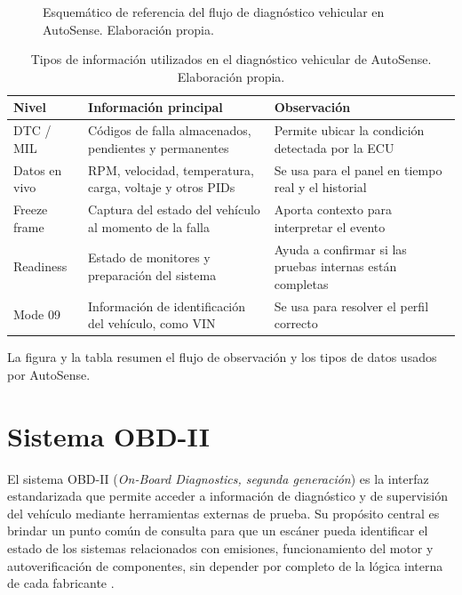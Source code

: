 \documentclass[12pt,letterpaper]{report}
\begin{document}
\begin{figure}[!htbp]
{
    }
    \caption{Esquemático de referencia del flujo de diagnóstico vehicular en AutoSense. Elaboración propia.}
    \label{fig:diagnostico-vehicular}
\end{figure}

\begin{table}[!htbp]
    \centering
    \caption{Tipos de información utilizados en el diagnóstico vehicular de AutoSense. Elaboración propia.}
    \label{tab:diagnostico-autosense}
    \small
    \begin{tabular}{p{}p{}p{}}
        \toprule
        Nivel & Información principal & Observación \\
        \midrule
        DTC / MIL & Códigos de falla almacenados, pendientes y permanentes & Permite ubicar la condición detectada por la ECU \\
        Datos en vivo & RPM, velocidad, temperatura, carga, voltaje y otros PIDs & Se usa para el panel en tiempo real y el historial \\
        Freeze frame & Captura del estado del vehículo al momento de la falla & Aporta contexto para interpretar el evento \\
        Readiness & Estado de monitores y preparación del sistema & Ayuda a confirmar si las pruebas internas están completas \\
        Mode 09 & Información de identificación del vehículo, como VIN & Se usa para resolver el perfil correcto \\
        \bottomrule
    \end{tabular}
\end{table}

La figura y la tabla resumen el flujo de observación y los tipos de datos usados por AutoSense.

\section{Sistema OBD-II}
\label{sec:sistema-obd2}

El sistema OBD-II (\textit{On-Board Diagnostics, segunda generación}) es la interfaz estandarizada que permite acceder a información de diagnóstico y de supervisión del vehículo mediante herramientas externas de prueba. Su propósito central es brindar un punto común de consulta para que un escáner pueda identificar el estado de los sistemas relacionados con emisiones, funcionamiento del motor y autoverificación de componentes, sin depender por completo de la lógica interna de cada fabricante \cite{sae2025_j1979_diagnostic_test_modes,epa2016_vehicle_emissions_obd}.
\end{document}
